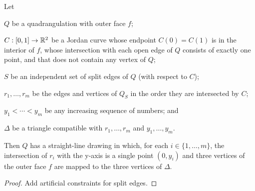\documentclass{patmorin}
\begin{document}
\begin{lem}
    Let
    \begin{compactitem}
    \item $Q$ be a quadrangulation with outer face $f$; 
    \item $C:[0,1]\to\mathbb{R}^2$ be a Jordan curve whose endpoint $C(0)=C(1)$ is
     in the interior of $f$, whose intersection with each open edge of
     $Q$ consists of exactly one point, and that does not contain any
     vertex of $Q$;
    \item $S$ be an independent set of split edges of $Q$ (with respect to $C$);
    \item $r_1,\ldots,r_m$ be the edges and vertices of $Q_S$ in the
    order they are intersected by $C$; 
    \item $y_1<\cdots< y_m$ be any increasing sequence of numbers; and
    \item $\Delta$ be a triangle compatible with $r_1,\ldots,r_m$ and $y_1,\ldots,y_m$.
    \end{compactitem}
    Then $Q$ has a straight-line drawing in which, for each
    $i\in\{1,\ldots,m\}$, the intersection of $r_i$ with the y-axis is
    a single point $(0,y_i)$ and three vertices of the outer face $f$
    are mapped to the three vertices of $\Delta$.
\end{lem}


\begin{proof}
  Add artificial constraints for split edges. 

\end{proof}

%
%
%
%
\end{document}
